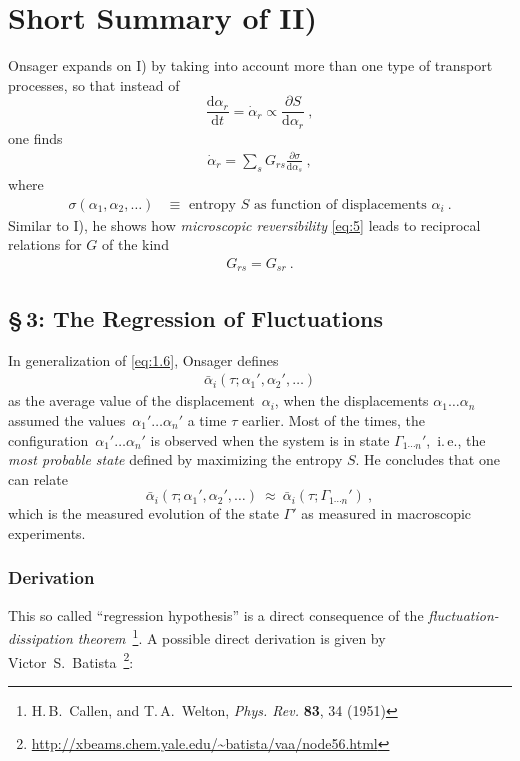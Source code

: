 \documentclass[a4paper]{article}
\renewcommand{\d}{\text{d}}
\begin{document}
\section{Short Summary of II)}
\label{sec:2}
Onsager expands on I) by taking into account more than one type of transport processes, so that instead of
$$
\frac{\d \alpha_r}{\d t} = \dot \alpha_r \propto \frac{\partial S}{\d \alpha_r}~,
$$
one finds
\begin{align}
    \dot \alpha_r = \sum_s G_{r s} \frac{\partial \sigma}{\d \alpha_s}~,
    \label{eq:6}
\end{align}
where
\begin{align*}
    \sigma (\alpha_1, \alpha_2, \ldots) &\equiv \text{ entropy } S \text{ as function of displacements } \alpha_i ~.
\end{align*}
Similar to I), he shows how \emph{microscopic reversibility} \eqref{eq:5} leads to reciprocal relations for $G$ of the kind
\begin{align}
    G_{rs} = G_{sr}~.
    \label{eq:7}
\end{align}

\subsection*{\S\,3: The Regression of Fluctuations}
In generalization of \eqref{eq:1.6}, Onsager defines 
\begin{align}
    \bar{\alpha}_i ( \tau; \alpha_1', \alpha_2', \ldots )
    \label{eq:8}
\end{align}
as the average value of the displacement~$\alpha_i$, when the displacements $\alpha_1 \ldots \alpha_n$ assumed the values~$\alpha_1' \ldots \alpha_n'$ a time $\tau$ earlier. Most of the times, the configuration~$\alpha_1' \ldots \alpha_n'$ is observed when the system is in state $\Gamma_{1 \cdots n}'$,~i.\,e., the \emph{most probable state} defined by maximizing the entropy $S$. He concludes that one can relate
$$ \bar{\alpha}_i ( \tau; \alpha_1', \alpha_2', \ldots ) 
~\approx~ \bar{\alpha}_i ( \tau; \Gamma_{1 \cdots n}') ~, $$
which is the measured evolution of the state $\Gamma'$ as measured in macroscopic experiments.

\subsubsection*{Derivation}
This so called ``regression hypothesis'' is a direct consequence of the \emph{fluctuation-dissipation theorem}~\footnote{H.\,B.~Callen, and T.\,A.~Welton, \emph{Phys. Rev.} \textbf{83}, 34 (1951)}. A possible direct derivation is given by Victor~S.~Batista~\footnote{\url{http://xbeams.chem.yale.edu/~batista/vaa/node56.html}}:
\end{document}

